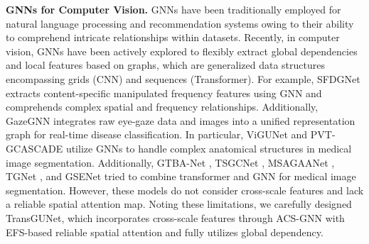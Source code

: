 \noindent \textbf{GNNs for Computer Vision.} GNNs have been traditionally employed for natural language processing \cite{kipf2016semi} and recommendation systems \cite{ying2018graph} owing to their ability to comprehend intricate relationships within datasets. Recently, in computer vision, GNNs \cite{han2022vision, han2023vision} have been actively explored to flexibly extract global dependencies and local features based on graphs, which are generalized data structures encompassing grids (CNN) and sequences (Transformer). For example, SFDGNet \cite{wang2023dynamic} extracts content-specific manipulated frequency features using GNN and comprehends complex spatial and frequency relationships. Additionally, GazeGNN \cite{wang2024gazegnn} integrates raw eye-gaze data and images into a unified representation graph for real-time disease classification. In particular, ViGUNet \cite{jiang2023vig} and PVT-GCASCADE \cite{rahman2024g} utilize GNNs to handle complex anatomical structures in medical image segmentation. Additionally, GTBA-Net \cite{xu2023graph}, TSGCNet \cite{duan20233d}, MSAGAANet \cite{wang2024multi}, TGNet \cite{zhang2025transgraphnet}, and GSENet \cite{li2025gse} tried to combine transformer and GNN for medical image segmentation. However, these models do not consider cross-scale features and lack a reliable spatial attention map. Noting these limitations, we carefully designed TransGUNet, which incorporates cross-scale features through ACS-GNN with EFS-based reliable spatial attention and fully utilizes global dependency.  